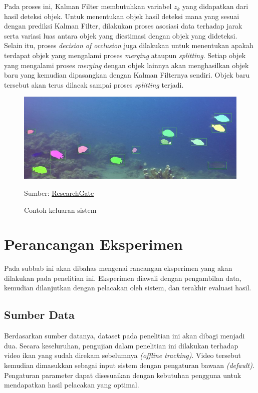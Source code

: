         Pada proses ini, Kalman Filter membutuhkan variabel $z_k$ yang didapatkan dari hasil deteksi objek. Untuk menentukan objek hasil deteksi mana yang sesuai dengan prediksi Kalman Filter, dilakukan proses asosiasi data terhadap jarak serta variasi luas antara objek yang diestimasi dengan objek yang dideteksi. Selain itu, proses \textit{decision of occlusion} juga dilakukan untuk menentukan apakah terdapat objek yang mengalami proses \textit{merging} ataupun \textit{splitting}. Setiap objek yang mengalami proses \textit{merging} dengan objek lainnya akan menghasilkan objek baru yang kemudian dipasangkan dengan Kalman Filternya sendiri. Objek baru tersebut akan terus dilacak sampai proses \textit{splitting} terjadi.
        
        \begin{figure}[H]
        \centering
          \singlespacing
          \captionsetup{justification=centering,margin=0.5cm}
          \includegraphics[width=13cm]{image/example_result.jpg}
          \caption{Contoh keluaran sistem}
          \small{Sumber: \href{https://www.researchgate.net/figure/Large-Frame-Fish-Detection-and-Instance-Segmentation_fig1_332153021}{ResearchGate}}
          \label{fig:example_result}
        \end{figure}
        
\section{Perancangan Eksperimen}

    Pada subbab ini akan dibahas mengenai rancangan eksperimen yang akan dilakukan pada penelitian ini. Eksperimen diawali dengan pengambilan data, kemudian dilanjutkan dengan pelacakan oleh sistem, dan terakhir evaluasi hasil.

    \subsection{Sumber Data}
        Berdasarkan sumber datanya, dataset pada penelitian ini akan dibagi menjadi dua. Secara keseluruhan, pengujian dalam penelitian ini dilakukan terhadap video ikan yang sudah direkam sebelumnya \textit{(offline tracking)}. Video tersebut kemudian dimasukkan sebagai input sistem dengan pengaturan bawaan \textit{(default)}. Pengaturan parameter dapat disesuaikan dengan kebutuhan pengguna untuk mendapatkan hasil pelacakan yang optimal.
        
